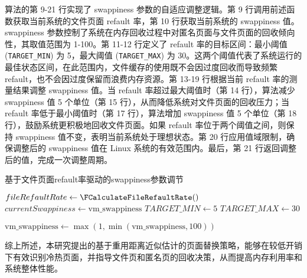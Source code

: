 算法的第 9-21 行实现了 swappiness 参数的自适应调整逻辑。第 9 行调用前述函数获取当前系统的文件页面 refault 率，第 10 行获取当前系统的 swappiness 值。swappiness 参数控制了系统在内存回收过程中对匿名页面与文件页面的回收倾向性，其取值范围为 1-100。第 11-12 行定义了 refault 率的目标区间：最小阈值 (\texttt{TARGET\_MIN}) 为 5，最大阈值 (\texttt{TARGET\_MAX}) 为 30。这两个阈值代表了系统运行的最佳状态区间，在此范围内，文件缓存的使用既不会因过度回收而导致频繁 refault，也不会因过度保留而浪费内存资源。第 13-19 行根据当前 refault 率的测量结果调整 swappiness 值。当 refault 率超过最大阈值时（第 14 行），算法减少 swappiness 值 5 个单位（第 15 行），从而降低系统对文件页面的回收压力；当 refault 率低于最小阈值时（第 17 行），算法增加 swappiness 值 5 个单位（第 18 行），鼓励系统更积极地回收文件页面。如果 refault 率位于两个阈值之间，则保持 swappiness 值不变，表明当前系统处于理想状态。第 20 行应用值域限制，确保调整后的 swappiness 值在 Linux 系统的有效范围内。最后，第 21 行返回调整后的值，完成一次调整周期。
\begin{algorithm}[htbp]
  \caption{基于文件页面refault率驱动的swappiness参数调节}
  \label{alg:swappiness1}
  
  
  \(fileRefaultRate \gets \FCalculateFileRefaultRate()\) \;
  \(currentSwappiness \gets \text{vm\_swappiness}\) \;  %
  \(TARGET\_MIN \gets 5\) \;
  \(TARGET\_MAX \gets 30\) \;
  
  \(\text{vm\_swappiness} \gets \max(1, \min(\text{vm\_swappiness}, 100))\) \;
\end{algorithm}

综上所述，本研究提出的基于重用距离近似估计的页面替换策略，能够在较低开销下有效识别冷热页面，并指导文件页和匿名页的回收决策，从而提高内存利用率和系统整体性能。

